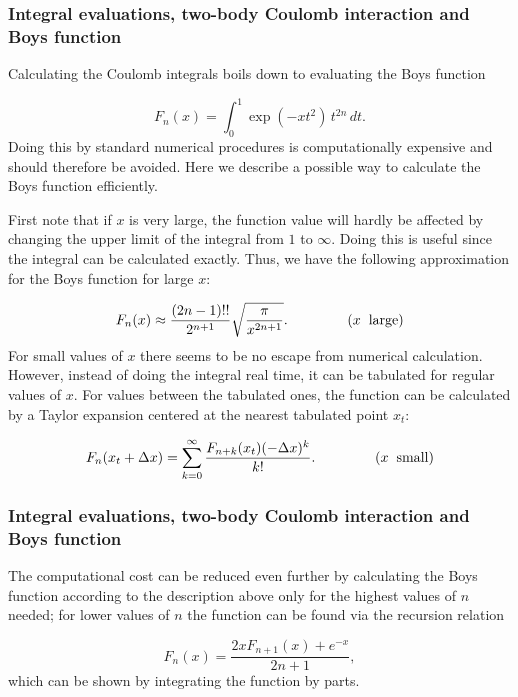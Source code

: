 \documentclass{beamer}
\begin{document}
\begin{frame}
\frametitle{Integral evaluations, two-body Coulomb interaction and Boys function}

\begin{block}{}

Calculating the Coulomb integrals boils down to evaluating the Boys function

\begin{equation}
 F_n(x) = \int_0^1\exp(-xt^2)\,t^{2n}\,dt.
\end{equation}
Doing this by standard numerical procedures is computationally
expensive and should therefore be avoided. Here we describe a possible way to calculate the Boys function efficiently.

First note that if $x$ is very large, the function value will hardly be affected by changing the upper limit of the integral from $1$ to $\infty$. Doing this is useful
since the integral can be calculated exactly. Thus, we have the following approximation for the Boys function for large $x$:

\begin{equation}
 F_n(x) \approx \frac{(2n-1)!!}{2^{n+1}}\sqrt{\frac{\pi}{x^{2n+1}}}. \hspace{15mm} (x\hspace{2mm}\mathrm{large})
\end{equation}
For small values of $x$ there seems to be no escape from numerical calculation. However, instead of doing the integral real time, it can be tabulated for regular values of $x$.
For values between the tabulated ones, the function can be calculated by a Taylor expansion centered at the nearest tabulated point $x_t$:

\begin{equation}
 F_n(x_t+\Delta x) = \sum_{k=0}^\infty\frac{F_{n+k}(x_t) (-\Delta x)^k}{k!}. \hspace{15mm} (x\hspace{2mm}\mathrm{small})
\end{equation}
\end{block}
\end{frame}

\begin{frame}
\frametitle{Integral evaluations, two-body Coulomb interaction and Boys function}

\begin{block}{}

The computational cost can be reduced even further by calculating the Boys function according to the description above only for the highest values of $n$ needed; for lower values of $n$ the function
can be found via the recursion relation

\begin{equation}
 F_n(x) = \frac{2xF_{n+1}(x)+e^{-x}}{2n+1},
\end{equation}
which can be shown by integrating the function by parts.
\end{block}
\end{frame}
\end{document}

